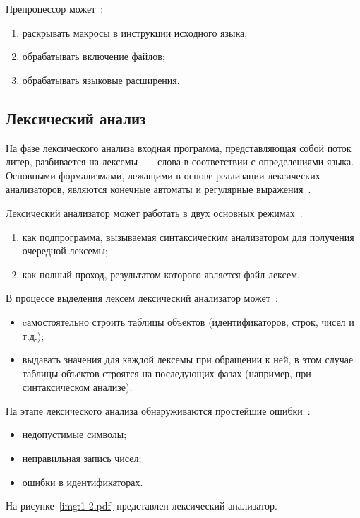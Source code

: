 Препроцессор может~\cite{aho2003,vladimirtov2004struct}:
\begin{enumerate}
    \item раскрывать макросы в инструкции исходного языка;
    \item обрабатывать включение файлов;
    \item обрабатывать языковые расширения.
\end{enumerate}

\subsection{Лексический анализ}

На фазе лексического анализа входная программа, представляющая собой поток литер, разбивается на лексемы~---~слова в соответствии с определениями языка. Основными формализмами, лежащими в основе реализации лексических анализаторов, являются конечные автоматы и регулярные выражения~\cite{serebrykov2001}.

Лексический анализатор может работать в двух основных режимах~\cite{serebrykov2001}:
\begin{enumerate}
    \item как подпрограмма, вызываемая синтаксическим анализатором для получения очередной лексемы;
    \item как полный проход, результатом которого является файл лексем.
\end{enumerate}

В процессе выделения лексем лексический анализатор может~\cite{serebrykov2001}:
\begin{itemize}
    \item cамостоятельно строить таблицы объектов (идентификаторов, строк, чисел и т.д.);
    \item выдавать значения для каждой лексемы при обращении к ней, в этом случае таблицы объектов строятся на последующих фазах (например, при синтаксическом анализе).
\end{itemize}

На этапе лексического анализа обнаруживаются простейшие ошибки~\cite{serebrykov2001}:
\begin{itemize}
    \item недопустимые символы;
    \item неправильная запись чисел;
    \item ошибки в идентификаторах.
\end{itemize}

На рисунке~\ref{img:1-2.pdf} представлен лексический анализатор.

